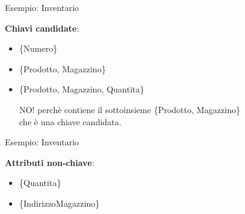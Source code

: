 %
\begin{frame}{Esempio: Inventario}
\vspace{-1cm}
\begin{center}
    \InventarioModified
\end{center}
\pause
\textbf{Chiavi candidate}:
\pause
\begin{itemize}[<+->]
    \item \{Numero\} 
    \item \{Prodotto, Magazzino\} 
    \item \{Prodotto, Magazzino, Quantita\} 
    \pause 
    
    {\small NO! perch\`e contiene il sottoinsieme \{Prodotto, Magazzino\}\\ che \`e una chiave candidata.}
\end{itemize}
\end{frame}
%
\begin{frame}{Esempio: Inventario}
\vspace{-1cm}
\begin{center}
    \InventarioModified
\end{center}
\pause
\textbf{Attributi non-chiave}:
\pause
\begin{itemize}[<+->]
    \item \{Quantita\}
    \item \{IndirizzoMagazzino\}
\end{itemize}
\end{frame}

